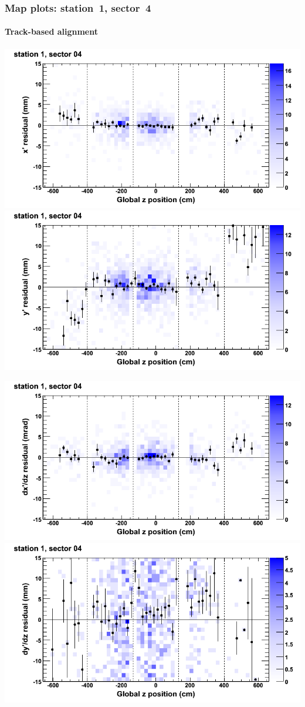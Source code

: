 \documentclass[compress]{beamer}
\begin{document}
\begin{frame}
\frametitle{Map plots: station~1, sector~4}
\framesubtitle{Track-based alignment}
\includegraphics[width=0.5\linewidth]{mapplots_re05/DTvsz_st1sec04_x.png}
\includegraphics[width=0.5\linewidth]{mapplots_re05/DTvsz_st1sec04_y.png}

\includegraphics[width=0.5\linewidth]{mapplots_re05/DTvsz_st1sec04_dxdz.png}
\includegraphics[width=0.5\linewidth]{mapplots_re05/DTvsz_st1sec04_dydz.png}
\end{frame}
\end{document}
